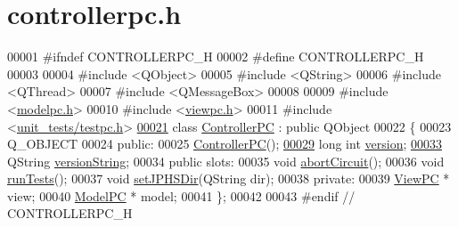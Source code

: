 \hypertarget{controllerpc_8h_source}{\section{controllerpc.\-h}
}

\begin{DoxyCode}
00001 \textcolor{preprocessor}{#ifndef CONTROLLERPC\_H}
00002 \textcolor{preprocessor}{}\textcolor{preprocessor}{#define CONTROLLERPC\_H}
00003 \textcolor{preprocessor}{}
00004 \textcolor{preprocessor}{#include <QObject>}
00005 \textcolor{preprocessor}{#include <QString>}
00006 \textcolor{preprocessor}{#include <QThread>}
00007 \textcolor{preprocessor}{#include <QMessageBox>}
00008 
00009 \textcolor{preprocessor}{#include <\hyperlink{modelpc_8h}{modelpc.h}>}
00010 \textcolor{preprocessor}{#include <\hyperlink{viewpc_8h}{viewpc.h}>}
00011 \textcolor{preprocessor}{#include <\hyperlink{testpc_8h}{unit\_tests/testpc.h}>}
\hypertarget{controllerpc_8h_source_l00021}{}\hyperlink{class_controller_p_c}{00021} \textcolor{keyword}{class }\hyperlink{class_controller_p_c}{ControllerPC} : \textcolor{keyword}{public} QObject
00022 \{
00023     Q\_OBJECT
00024 \textcolor{keyword}{public}:
00025     \hyperlink{class_controller_p_c_afa6c92d67bf3b6531c42385fc5938003}{ControllerPC}();
\hypertarget{controllerpc_8h_source_l00029}{}\hyperlink{class_controller_p_c_a9eb43c34237d66751a6411e55cf5f55e}{00029}     \textcolor{keywordtype}{long} \textcolor{keywordtype}{int} \hyperlink{class_controller_p_c_a9eb43c34237d66751a6411e55cf5f55e}{version};
\hypertarget{controllerpc_8h_source_l00033}{}\hyperlink{class_controller_p_c_a0e63cca37d6ce2e660f3380400c2c5f3}{00033}     QString \hyperlink{class_controller_p_c_a0e63cca37d6ce2e660f3380400c2c5f3}{versionString};
00034 \textcolor{keyword}{public} slots:
00035     \textcolor{keywordtype}{void} \hyperlink{class_controller_p_c_a8814989f7be1214e06b2e720889066b0}{abortCircuit}();
00036     \textcolor{keywordtype}{void} \hyperlink{class_controller_p_c_aaa59fc90e1ef731eee4560ec87e43707}{runTests}();
00037     \textcolor{keywordtype}{void} \hyperlink{class_controller_p_c_ac00d29685a7e5b780c01eb438e10f96d}{setJPHSDir}(QString dir);
00038 \textcolor{keyword}{private}:
00039     \hyperlink{class_view_p_c}{ViewPC} * view;
00040     \hyperlink{class_model_p_c}{ModelPC} * model;
00041 \};
00042 
00043 \textcolor{preprocessor}{#endif // CONTROLLERPC\_H}
\end{DoxyCode}
